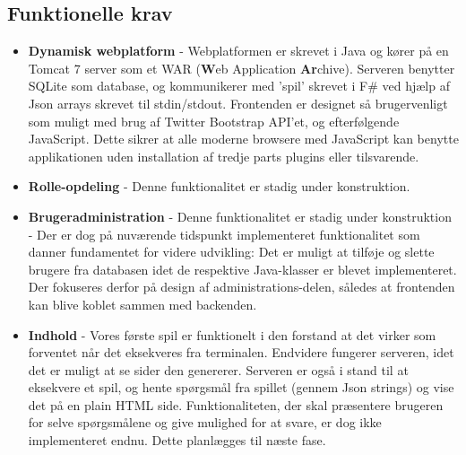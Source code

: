 \documentclass[12pt, a4paper]{article}
\begin{document}
\subsection{Funktionelle krav}
\begin{itemize}
  \item \textbf{Dynamisk webplatform} - %
  Webplatformen er skrevet i Java og kører på en Tomcat 7 server som et WAR (\textbf{W}eb Application \textbf{Ar}chive). Serveren benytter SQLite som database, og kommunikerer med 'spil' skrevet i F\# ved hjælp af Json arrays skrevet til stdin/stdout. Frontenden er designet så brugervenligt som muligt med brug af Twitter Bootstrap API'et, og efterfølgende JavaScript. Dette sikrer at alle moderne browsere med JavaScript kan benytte applikationen uden installation af tredje parts plugins eller tilsvarende.
  
  \item \textbf{Rolle-opdeling} - %
  Denne funktionalitet er stadig under konstruktion.
  
  
  
  \item \textbf{Brugeradministration} - %
  Denne funktionalitet er stadig under konstruktion - Der er dog på nuværende tidspunkt implementeret funktionalitet som danner fundamentet for videre udvikling: Det er muligt at tilføje og slette brugere fra databasen idet de respektive Java-klasser er blevet implementeret. Der fokuseres derfor på design af administrations-delen, således at frontenden kan blive koblet sammen med backenden.
  
  
  \item \textbf{Indhold} - %
  Vores første spil er funktionelt i den forstand at det virker som forventet når det eksekveres fra terminalen. Endvidere fungerer serveren, idet det er muligt at se sider den genererer. Serveren er også i stand til at eksekvere et spil, og hente spørgsmål fra spillet (gennem Json strings) og vise det på en plain HTML side. Funktionaliteten, der skal præsentere brugeren for selve spørgsmålene og give mulighed for at svare, er dog ikke implementeret endnu. Dette planlægges til næste fase.
  

\end{itemize}
\end{document}
